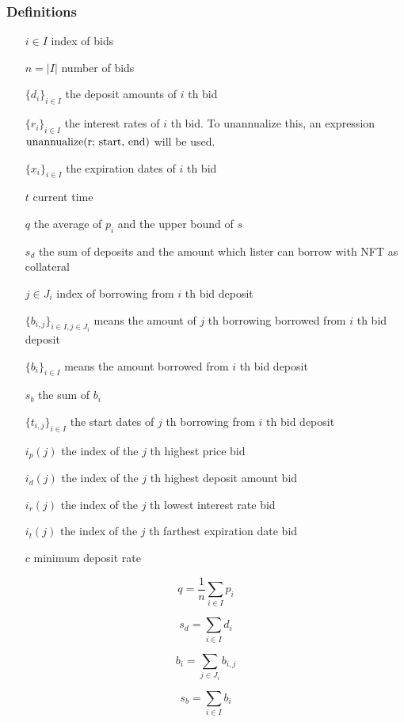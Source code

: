 \documentclass[dvipdfmx]{jsarticle}
\begin{document}
\subsubsection{Definitions}

\begin{itemize}
  \item[$i \in I$] index of bids
  \item[$n = |I|$] number of bids
  \item[$\{d_i\}_{i \in I}$] the deposit amounts of $i$ th bid
  \item[$\{r_i\}_{i \in I}$] the interest rates of $i$ th bid. To unannualize this, an expression $\text{unannualize(r; \text{start}, \text{end})}$ will be used.
  \item[$\{x_i\}_{i \in I}$] the expiration dates of $i$ th bid
  \item[$t$] current time 
  \item[$q$] the average of $p_i$ and the upper bound of $s$
  \item[$s_d$] the sum of deposits and the amount which lister can borrow with NFT as collateral
  \item[$j \in J_i$] index of borrowing from $i$ th bid deposit 
  \item[$\{b_{i,j}\}_{i \in I, j \in J_i}$] means the amount of $j$ th borrowing borrowed from $i$ th bid deposit
  \item[$\{b_i\}_{i \in I}$] means the amount borrowed from $i$ th bid deposit
  \item[$s_b$] the sum of $b_i$
  \item[$\{t_{i,j}\}_{i \in I}$] the start dates of $j$ th borrowing from $i$ th bid deposit
  \item[$i_p(j)$] the index of the $j$ th highest price bid
  \item[$i_d(j)$] the index of the $j$ th highest deposit amount bid
  \item[$i_r(j)$] the index of the $j$ th lowest interest rate bid
  \item[$i_t(j)$] the index of the $j$ th farthest expiration date bid
  \item[$c$] minimum deposit rate
\end{itemize}

$$
  q = \frac{1}{n} \sum_{i \in I} p_i
$$

$$
  s_d = \sum_{i \in I} d_i
$$

$$
  b_i = \sum_{j \in J_i} b_{i,j}
$$

$$
  s_b = \sum_{i \in I} b_i
$$
\end{document}
